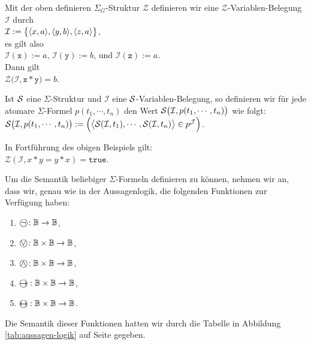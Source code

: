 \example
Mit der oben definieren $\Sigma_G$-Struktur
$\mathcal{Z}$ definieren wir eine $\mathcal{Z}$-Variablen-Belegung $\mathcal{I}$ durch
\\[0.2cm]
\hspace*{1.3cm} $\mathcal{I} := \bigl\{ \pair(x,a), \pair(y,b), \pair(z,a)\bigr\}$,
\\[0.2cm]
es gilt also
\\[0.2cm]
\hspace*{1.3cm} $\mathcal{I}(\mathtt{x}) := a$, \quad $\mathcal{I}(\mathtt{y}) := b$, \quad und \quad $\mathcal{I}(\mathtt{z}) := a$.
\\[0.2cm]
Dann gilt  \\[0.2cm]
\hspace*{1.3cm}  $\mathcal{Z}\bigl(\mathcal{I}, \mathtt{x} * \mathtt{y} \bigr) = b$. \eox

\begin{Definition}
    Ist $\mathcal{S}$ eine $\Sigma$-Struktur und $\mathcal{I}$ eine $\mathcal{S}$-Variablen-Belegung,
    so definieren wir f\"{u}r jede atomare $\Sigma$-Formel 
    $p(t_1, \cdots, t_n)$ den Wert $\mathcal{S}\bigl(\mathcal{I}, p(t_1, \cdots, t_n) \bigr)$ wie folgt: \\[0.2cm]
    \hspace*{1.3cm}
    $\mathcal{S}\bigl(\mathcal{I}, p(t_1,\cdots,t_n)\bigr) := 
       \Bigl(\bigl\langle \mathcal{S}(\mathcal{I}, t_1), \cdots, \mathcal{S}(\mathcal{I}, t_n) \bigr\rangle \in p^\mathcal{J}\Bigr)$.
    \eox
\end{Definition}

\example
In Fortf\"{u}hrung des obigen Beispiels gilt: 
\\[0.2cm]
\hspace*{1.3cm} 
$\mathcal{Z}(\mathcal{I},x * y = y * x) = \mathtt{true}$.
\eox

Um die Semantik beliebiger $\Sigma$-Formeln definieren zu k\"{o}nnen, nehmen wir an, dass wir,
genau wie in der Aussagenlogik, die folgenden Funktionen zur Verf\"{u}gung haben:
\begin{enumerate}
\item $\circneg: \mathbb{B} \rightarrow \mathbb{B}$,
\item $\circvee: \mathbb{B} \times \mathbb{B} \rightarrow \mathbb{B}$,
\item $\circwedge: \mathbb{B} \times \mathbb{B} \rightarrow \mathbb{B}$,
\item $\circright: \mathbb{B} \times \mathbb{B} \rightarrow \mathbb{B}$,
\item $\circleftright: \mathbb{B} \times \mathbb{B} \rightarrow \mathbb{B}$.
\end{enumerate}
Die Semantik dieser Funktionen hatten wir durch die Tabelle in Abbildung
\ref{tab:aussagen-logik} auf Seite \pageref{tab:aussagen-logik} gegeben. 


